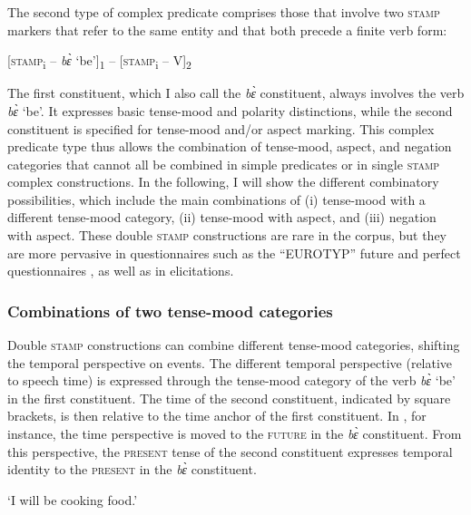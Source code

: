 The second type of complex predicate comprises those that involve two \textsc{stamp} markers that refer to the same entity and that both precede a finite verb form: 
\begin{center}[\textsc{stamp}\textsubscript{i} -- {\itshape bɛ̀} `be']\textsubscript{1} -- [\textsc{stamp}\textsubscript{i} -- V]\textsubscript{2}
\end{center}
 
\noindent The first constituent, which I also call the {\itshape bɛ̀} constituent, always involves the verb {\itshape bɛ̀} `be'. It expresses basic tense-mood and polarity distinctions, while the second constituent is specified for tense-mood and/or aspect marking. This complex predicate type thus allows  the combination of tense-mood, aspect, and negation categories that cannot all be combined in simple predicates or in single \textsc{stamp} complex constructions. In the following, I will show the different combinatory possibilities, which include the main combinations of (i) tense-mood with a different tense-mood category, (ii) tense-mood with aspect, and (iii) negation with aspect. These double \textsc{stamp} constructions are rare in the corpus, but they are more pervasive in questionnaires such as the ``EUROTYP''    future and perfect questionnaires \citep{dahl2000}, as well as in elicitations.

\subsubsection*{Combinations of two tense-mood categories}
Double \textsc{stamp} constructions can combine different tense-mood categories, shifting the temporal perspective on events. The different temporal perspective (relative to speech time) is expressed through the tense-mood category of the verb {\itshape bɛ̀} `be' in the first constituent.  The time of the  second constituent, indicated by square brackets, is then relative to the time anchor of the first constituent. In , for instance, the time perspective is moved to the \textsc{future} in the {\itshape bɛ̀} constituent. From this perspective, the \textsc{present} tense of the second constituent expresses temporal identity to the \textsc{present} in the {\itshape bɛ̀} constituent.

    \trans `I will be cooking food.'
\z


